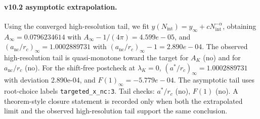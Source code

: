 \paragraph{v10.2 asymptotic extrapolation.}
Using the converged high-resolution tail, we fit $y(N_{\mathrm{int}})=y_{\infty}+cN_{\mathrm{int}}^{-\alpha}$, obtaining $A_\infty=0.0796234614$ with $A_\infty-1/(4\pi)=4.599e-05$, and $(a_{\mathrm{nc}}/r_c)_\infty=1.0002889731$ with $(a_{\mathrm{nc}}/r_c)_\infty-1=2.890e-04$. The observed high-resolution tail is quasi-monotone toward the target for $A_K$ (no) and for $a_{\mathrm{nc}}/r_c$ (no). For the shift-free postcheck at $\lambda_K=0$, $(a^*/r_c)_\infty=1.0002889731$ with deviation 2.890e-04, and $F(1)_\infty=-5.779e-04$. The asymptotic tail uses root-choice labels \texttt{targeted_x_nc:3}. Tail checks: $a^*/r_c$ (no), $F(1)$ (no). A theorem-style closure statement is recorded only when both the extrapolated limit and the
observed high-resolution tail support the same conclusion.
